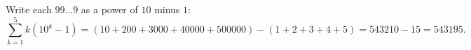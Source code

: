 Write each $99\ldots9$ as a power of $10$ minus $1$:
\[
\sum_{k=1}^{5}k\left(10^k-1\right)=\left(10+200+3000+40000+500000\right)-(1+2+3+4+5)=543210-15=\boxed{543195}.
\]
